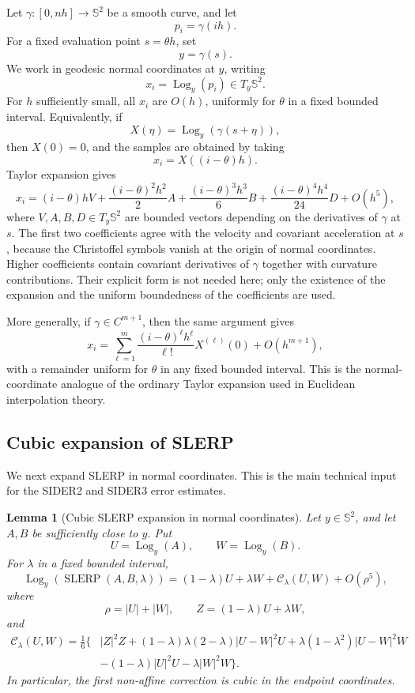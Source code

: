 \documentclass[a4paper,11pt]{article}
\newcommand{\bS}{\mathbb{S}}
\newcommand{\Log}{\operatorname{Log}}
\newcommand{\SLERP}{\operatorname{SLERP}}
\newtheorem{lemma}{Lemma}
\numberwithin{equation}{section}
\begin{document}
Let \(\gamma:[0,nh]\to\bS^2\) be a smooth curve, and let
\[
        p_i=\gamma(ih).
\]
For a fixed evaluation point \(s=\theta h\), set
\[
        y=\gamma(s).
\]
We work in geodesic normal coordinates at \(y\), writing
\[
        x_i=\Log_y(p_i)\in T_y\bS^2 .
\]
For \(h\) sufficiently small, all \(x_i\) are \(O(h)\), uniformly for
\(\theta\) in a fixed bounded interval.  Equivalently, if
\[
        X(\eta)=\Log_y(\gamma(s+\eta)),
\]
then \(X(0)=0\), and the samples are obtained by taking
\[
        x_i=X((i-\theta)h).
\]
Taylor expansion gives
\begin{equation}
\label{eq:curve_taylor}
x_i
=
(i-\theta)h V
+\frac{(i-\theta)^2h^2}{2}A
+\frac{(i-\theta)^3h^3}{6}B
+\frac{(i-\theta)^4h^4}{24}D
+O(h^5),
\end{equation}
where \(V,A,B,D\in T_y\bS^2\) are bounded vectors depending on the derivatives
of \(\gamma\) at \(s\).  The first two coefficients agree with the velocity and
covariant acceleration at \(s\), because the Christoffel symbols vanish at the
origin of normal coordinates.  Higher coefficients contain covariant
derivatives of \(\gamma\) together with curvature contributions.  Their
explicit form is not needed here; only the existence of the expansion and the
uniform boundedness of the coefficients are used.

More generally, if \(\gamma\in C^{m+1}\), then the same argument gives
\[
        x_i
        =
        \sum_{\ell=1}^{m}
        \frac{(i-\theta)^\ell h^\ell}{\ell!}X^{(\ell)}(0)
        +O(h^{m+1}),
\]
with a remainder uniform for \(\theta\) in any fixed bounded interval.  This
is the normal-coordinate analogue of the ordinary Taylor expansion used in
Euclidean interpolation theory.

\subsection{Cubic expansion of SLERP}

We next expand SLERP in normal coordinates.  This is the main technical input
for the SIDER2 and SIDER3 error estimates.

\begin{lemma}[Cubic SLERP expansion in normal coordinates]
\label{lem:cubic_slerp}
Let \(y\in\bS^2\), and let \(A,B\) be sufficiently close to \(y\).  Put
\[
        U=\Log_y(A),\qquad W=\Log_y(B).
\]
For \(\lambda\) in a fixed bounded interval,
\begin{equation}
\label{eq:cubic_slerp}
\Log_y\!\left(\SLERP(A,B,\lambda)\right)
=
(1-\lambda)U+\lambda W+\mathcal C_\lambda(U,W)+O(\rho^5),
\end{equation}
where
\[
        \rho=|U|+|W|,
        \qquad
        Z=(1-\lambda)U+\lambda W,
\]
and
\begin{align}
\label{eq:cubic_term}
\mathcal C_\lambda(U,W)
= \frac{1}{6}\Big\{&
|Z|^2Z
+(1-\lambda)\lambda(2-\lambda)|U-W|^2U
+\lambda(1-\lambda^2)|U-W|^2W     \nonumber\\
&-(1-\lambda)|U|^2U
-\lambda |W|^2W
\Big\}.
\end{align}
In particular, the first non-affine correction is cubic in the endpoint
coordinates.
\end{lemma}
\end{document}

